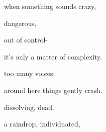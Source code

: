 \documentclass[extrafontsizes, 48pt]{memoir}
\newcommand\blankpage{%
    \null
    \thispagestyle{empty}%
    \addtocounter{page}{-1}%
    \newpage}
\begin{document}
	\begin{minipage}{.6\textwidth}
	when something sounds crazy,
	\end{minipage}
	\newpage

	\begin{minipage}{.6\textwidth}
	dangerous,
	\end{minipage}
	\newpage

	\begin{minipage}{.6\textwidth}
	out of control-
	\end{minipage}
	\newpage

	\begin{minipage}{.6\textwidth}
	it's only a matter of complexity.
	\end{minipage}
	\newpage

	\begin{minipage}{.6\textwidth}
	too many voices.
	\afterpage{\blankpage}
	\end{minipage}
	\newpage

	\begin{minipage}{.6\textwidth}
	around here things gently crash.
	\end{minipage}
	\newpage

	\begin{minipage}{.6\textwidth}
	dissolving, dead.
	\end{minipage}
	\newpage

	\begin{minipage}{.6\textwidth}
	a raindrop, individuated, 
	\end{minipage}
	\newpage
\end{document}
